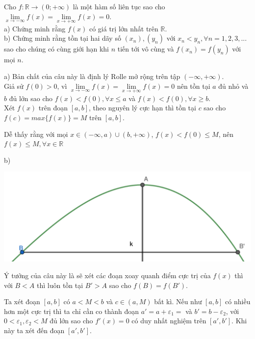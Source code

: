 \documentclass[11pt]{scrartcl}
\begin{document}
\begin{itemize}[label=, leftmargin=0em, itemsep=0.5em]
\begin{sol}
    \end{sol}

    \begin{bt}
        Cho $f:\mathbb{R}\to (0;+\infty)$ là một hàm số liên tục sao cho $\underset{x\to -\infty }{\mathop{\lim }}f(x)=\underset{x\to +\infty }{\mathop{\lim }}f(x)=0.$\\
a) Chứng minh rằng $f(x)$ có giá trị lớn nhất trên $\mathbb{R}.$\\
b) Chứng minh rằng tồn tại hai dãy số $({{x}_{n}}),({{y}_{n}})$ với ${{x}_{n}}<{{y}_{n}},\forall n=1,2,3,...$ sao cho chúng có cùng giới hạn khi $n$ tiến tới vô cùng và $f({{x}_{n}})=f({{y}_{n}})$ với mọi $n$.
    \end{bt}

    \begin{sol}
        a) Bản chất của câu này là định lý Rolle mở rộng trên tập $(-\infty,+\infty)$. \\
        Giả sử $f(0) > 0$, vì $\underset{x\to -\infty }{\mathop{\lim }}f(x)=\underset{x\to +\infty }{\mathop{\lim }}f(x)=0$ nên tồn tại $a$ đủ nhỏ và $b$ đủ lớn sao cho $f(x) < f(0), \forall x \leq a$ và $f(x) < f(0), \forall x \geq b$.\\ Xét $f(x)$ trên đoạn $[a,b]$, theo nguyên lý cực hạn thì tồn tại $c$ sao cho $f(c) = max\{f(x)\} = M$ trên $[a,b]$. 
        
        
        Dễ thấy rằng với mọi $x \in (-\infty, a) \cup (b, +\infty)$, $f(x) < f(0) \leq M$, nên $f(x) \leq M, \forall x \in \mathbb{R}$


        b)
        \begin{center}
            \includegraphics[scale=0.4]{Image/2019.pdf}
        \end{center}
        Ý tưởng của câu này là sẽ xét các đoạn xoay quanh điểm cực trị của $f(x)$ thì với $B < A$ thì luôn tồn tại $B' > A$ sao cho $f(B)  = f(B')$.
        
        
        Ta xét đoạn $[a,b]$ có $a < M < b$ và $c \in (a,M)$ bất kì. Nếu như $[a,b]$ có nhiều hơn một cực trị thì ta chỉ cần co thành đoạn $a' = a + \varepsilon_1 = $ và $b' = b - \varepsilon_2$, với $0 < \varepsilon_1, \varepsilon_2 < M$ đủ lớn sao cho $f'(x) = 0$ có duy nhất nghiệm trên $[a',b']$. Khi này ta xét đến đoạn $[a',b']$. 
        

\end{sol}
\end{itemize}
\end{document}
